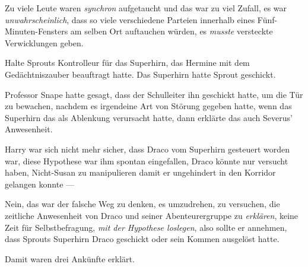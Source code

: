 Zu viele Leute waren \emph{synchron} aufgetaucht und das war zu viel Zufall, es war \emph{unwahrscheinlich}, dass so viele verschiedene Parteien innerhalb eines Fünf-Minuten-Fensters am selben Ort auftauchen würden, es \emph{musste} versteckte Verwicklungen geben.

Halte Sprouts Kontrolleur für das Superhirn, das Hermine mit dem Gedächtniszauber beauftragt hatte. Das Superhirn hatte Sprout geschickt.

Professor Snape hatte gesagt, dass der Schulleiter ihn geschickt hatte, um die Tür zu bewachen, nachdem es irgendeine Art von Störung gegeben hatte, wenn das Superhirn das als Ablenkung verursacht hatte, dann erklärte das auch Severus’ Anwesenheit.

Harry war sich nicht mehr sicher, dass Draco vom Superhirn gesteuert worden war, diese Hypothese war ihm spontan eingefallen, Draco könnte nur versucht haben, Nicht-Susan zu manipulieren damit er ungehindert in den Korridor gelangen konnte —

Nein, das war der falsche Weg zu denken, es umzudrehen, zu versuchen, die zeitliche Anwesenheit von Draco und seiner Abenteurergruppe zu \emph{erklären}, keine Zeit für Selbstbefragung, \emph{mit der Hypothese loslegen}, also sollte er annehmen, dass Sprouts Superhirn Draco geschickt oder sein Kommen ausgelöst hatte.

Damit waren drei Ankünfte erklärt.

